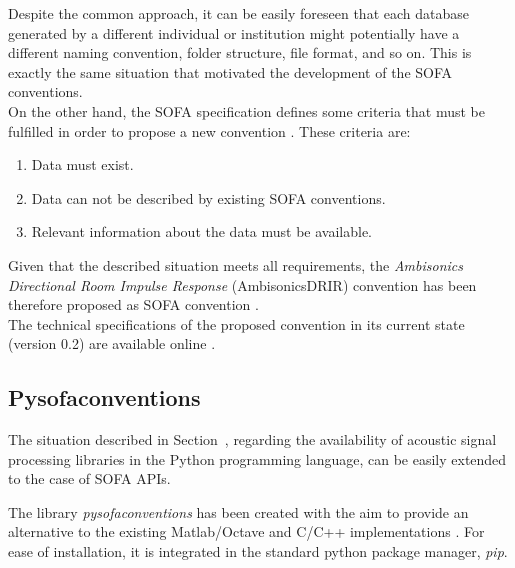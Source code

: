 Despite the common approach, it can be easily foreseen that each database generated by a different individual or institution might potentially have a different naming convention, folder structure, file format, and so on. 
This is exactly the same situation that motivated the development of the SOFA conventions. \\

On the other hand, the SOFA specification defines some criteria that must be fulfilled in order to propose a new convention \cite{sofaconventions}. These criteria are:
\begin{enumerate}
    \item Data must exist.
    \item Data can not be described by existing SOFA conventions.
    \item Relevant information about the data must be available.
\end{enumerate} 

Given that the described situation meets all requirements, the \textit{Ambisonics Directional Room Impulse Response} (AmbisonicsDRIR) convention has been therefore proposed as SOFA convention \cite{perez2018ambisonics}.\\

The technical specifications of the proposed convention in its current state (version 0.2) are available online \cite{ambisonicsdrir}.


\subsection{Pysofaconventions}

The situation described in Section~\label{sec:intro_data}, regarding the availability of acoustic signal processing libraries in the Python programming language, can be easily extended to the case of SOFA APIs.
 
The library \textit{pysofaconventions} has been created with the aim to provide an alternative to the existing Matlab/Octave and C/C++ implementations \cite{pysofaconventions}.
For ease of installation, it is integrated in the standard python package manager, \textit{pip}. 

